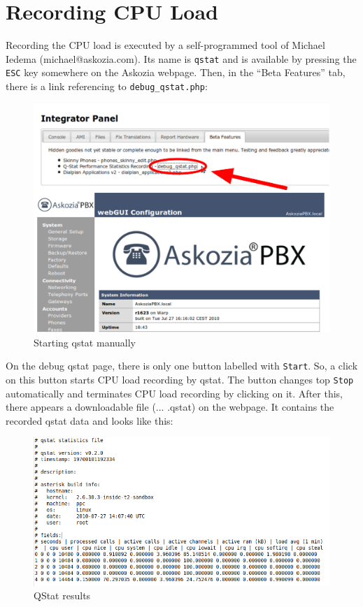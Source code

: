 \section{Recording CPU Load}
\label{sec:qstat}

Recording the CPU load is executed by a self-programmed tool of Michael Iedema \newline (michael@askozia.com). Its name is
\texttt{qstat} and is available by pressing the \texttt{ESC} key somewhere on the Askozia webpage. Then, in the
``Beta Features'' tab, there is a link referencing to \texttt{debug\_qstat.php}:

\begin{figure} [!ht]
\centering
\includegraphics [width=16cm] {qstat-1.pdf}
\caption{Starting qstat manually}
\end{figure}

On the debug qstat page, there is only one button labelled with \texttt{Start}. So, a click on this button starts CPU load
recording by qstat. The button changes top \texttt{Stop} automatically and terminates CPU load recording by clicking on it.
After this, there appears a downloadable file (... .qstat) on the webpage. It contains the recorded qstat data and looks like this:

\newpage
\begin{figure} [!ht]
\centering
\includegraphics [width=17cm] {qstat-2}
\caption{QStat results}
\label{fig:qstat-output}
\end{figure}

